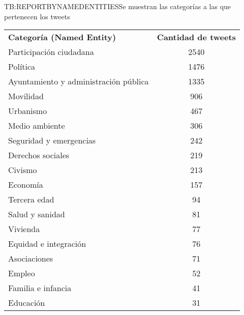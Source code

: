 \begin{table}[Resultados de la clasificación de los tweets semánticamente por categorías.]{TB:REPORTBYNAMEDENTITIES}{Se muestran las categorías a las que pertenecen los tweets}
	
	\begin{tabular}{|p{8cm}|c|}
		\hline
		\textbf{Categoría (Named Entity)} & \textbf{Cantidad de tweets} \\
		Participación ciudadana & 2540 \\
		Política & 1476 \\
		Ayuntamiento y administración pública & 1335 \\
		Movilidad & 906 \\
		Urbanismo & 467 \\
		Medio ambiente & 306 \\
		Seguridad y emergencias & 242 \\
		Derechos sociales & 219 \\
		Civismo & 213 \\
		Economía & 157 \\
		Tercera edad & 94 \\
		Salud y sanidad & 81 \\
		Vivienda & 77 \\
		Equidad e integración & 76 \\
		Asociaciones & 71 \\
		Empleo & 52 \\
		Familia e infancia & 41 \\
		Educación & 31 \\
		\hline \hline
		\hline
	\end{tabular}
\end{table}

